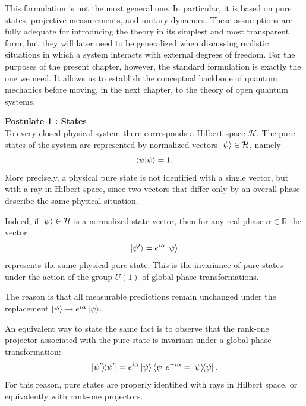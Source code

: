 This formulation is not the most general one. In particular, it is based on pure states, projective measurements, and unitary dynamics. These assumptions are fully adequate for introducing the theory in its simplest and most transparent form, but they will later need to be generalized when discussing realistic situations in which a system interacts with external degrees of freedom. For the purposes of the present chapter, however, the standard formulation is exactly the one we need. It allows us to establish the conceptual backbone of quantum mechanics before moving, in the next chapter, to the theory of open quantum systems.

\medskip

\textbf{Postulate 1 : States}
\\
To every closed physical system there corresponds a Hilbert space $\mathcal{H}$. The pure states of the system are represented by normalized vectors $\ket{\psi}\in\mathcal{H}$, namely
\begin{equation}
	\braket{\psi}{\psi}=1.
	\label{eq:intro_qm_state_normalization}
\end{equation}
More precisely, a physical pure state is not identified with a single vector, but with a ray in Hilbert space, since two vectors that differ only by an overall phase describe the same physical situation.

Indeed, if $\ket{\psi}\in\mathcal{H}$ is a normalized state vector, then for any real phase $\alpha\in\mathds{R}$ the vector
\begin{equation}
	\ket{\psi'} = e^{i\alpha}\ket{\psi}
	\label{eq:intro_qm_global_phase_transformation}
\end{equation}
represents the same physical pure state. This is the invariance of pure states under the action of the group $U(1)$ of global phase transformations.

The reason is that all measurable predictions remain unchanged under the replacement $\ket{\psi}\to e^{i\alpha}\ket{\psi}$.

An equivalent way to state the same fact is to observe that the rank-one projector associated with the pure state is invariant under a global phase transformation:
\begin{equation}
	\dyad{\psi'}{\psi'} = e^{i\alpha}\ket{\psi}\bra{\psi}e^{-i\alpha} = \dyad{\psi}{\psi}.
	\label{eq:intro_qm_projector_global_phase_invariance}
\end{equation}
For this reason, pure states are properly identified with rays in Hilbert space, or equivalently with rank-one projectors.

